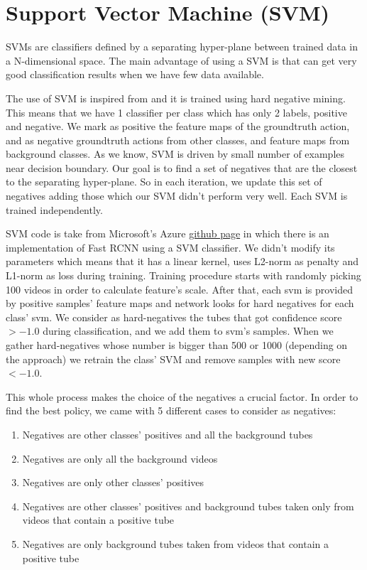 \section{Support Vector Machine (SVM)}
SVMs are classifiers defined by a separating hyper-plane between trained data in a N-dimensional space. The main advantage of using a SVM
is that can get very good classification results when we have few data available. \par
The use of SVM is inspired from \cite{Girshick:2015:FR:2919332.2920125} and it is trained using hard negative mining. 
This means that we have 1 classifier per class which has only 2 labels, positive and negative. We mark as positive the feature maps of the
groundtruth action, and as negative groundtruth actions from other classes, and feature maps from background classes.
As we know, SVM is driven by small number of examples near decision boundary. Our goal is to find a set of negatives that are the closest to
the separating hyper-plane. So in each iteration, we update this set of negatives adding those which our SVM didn't perform very well. Each
SVM is trained independently. \par
SVM code is take from Microsoft's Azure \href{https://github.com/Azure/ObjectDetectionUsingCntk} {github page} in which there is an implementation
of Fast RCNN using a SVM classifier. We didn't modify its parameters which means that it has a linear kernel, uses  L2-norm as penalty and L1-norm
as loss during training. Training procedure starts with randomly picking 100 videos in order to calculate feature's scale.
After that, each svm is provided by positive samples' feature maps and network looks for hard negatives for each class' svm. We consider as hard-negatives the tubes
that got confidence score $ >  -1.0 $ during classification, and we add them to svm's samples. When we gather  hard-negatives whose number is bigger than 500 or 1000 (depending
on the approach) we retrain the class' SVM and remove samples with new score $ < -1.0$.  \par 
This whole process makes the choice of the negatives a crucial factor. In order to find the best policy,  we came with 5 different cases to consider
as negatives:
\begin{enumerate}
\item Negatives are other classes' positives and all the background tubes
\item Negatives are only all the background videos
\item Negatives are only other classes' positives
\item Negatives are other classes' positives and background tubes taken only from videos that contain a positive tube
\item Negatives are only background tubes taken from videos that contain a positive tube
\end{enumerate}


